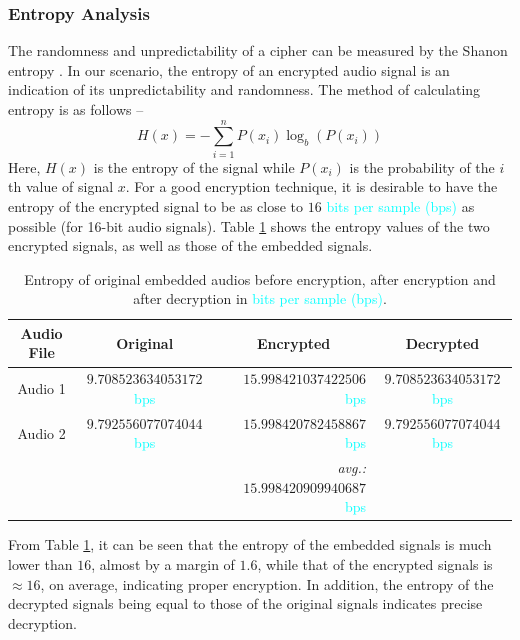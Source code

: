 \documentclass[a4paper]{cas-sc}
\begin{document}
\subsubsection{Entropy Analysis}
The randomness and unpredictability of a cipher can be measured by the Shanon entropy \cite{shannon1948mathematical}. In our scenario, the entropy of an encrypted audio signal is an indication of its unpredictability and randomness. The method of calculating entropy is as follows --
\begin{equation}
    H(x)=-\sum_{i=1}^{n}P(x_i)\log_{b}(P(x_i))
\end{equation}
Here, $H(x)$ is the entropy of the signal while $P(x_i)$ is the probability of the $i$th value of signal $x$. For a good encryption technique, it is desirable to have the entropy of the encrypted signal to be as close to $16$ \textcolor{cyan}{bits per sample (bps)} as possible (for 16-bit audio signals). Table \ref{table:entropy} shows the entropy values of the two encrypted signals, as well as those of the embedded signals.
\begin{table}[pos=h]
    \begin{center}
        \caption{Entropy of original embedded audios before encryption, after encryption and after decryption in \textcolor{cyan}{bits per sample (bps)}.}
        \begin{tabular}{ccrc}
            \hline
            \multicolumn{1}{c|}{Audio File} & Original                                  & \multicolumn{1}{c}{Encrypted}                                      & Decrypted                                 \\ \hline
            \multicolumn{1}{c|}{Audio 1}    & $9.708523634053172$ \textcolor{cyan}{bps} & $15.998421037422506$ \textcolor{cyan}{bps}                         & $9.708523634053172$ \textcolor{cyan}{bps} \\
            \multicolumn{1}{c|}{Audio 2}    & $9.792556077074044$ \textcolor{cyan}{bps} & $15.998420782458867$ \textcolor{cyan}{bps}                         & $9.792556077074044$ \textcolor{cyan}{bps} \\ \hline
                                            &                                           & \textit{avg.:}$\mathbf{~15.998420909940687}$ \textcolor{cyan}{bps} &
        \end{tabular}
        \label{table:entropy}
    \end{center}
\end{table}

From Table \ref{table:entropy}, it can be seen that the entropy of the embedded signals is much lower than $16$, almost by a margin of $1.6$, while that of the encrypted signals is $\approx16$, on average, indicating proper encryption. In addition, the entropy of the decrypted signals being equal to those of the original signals indicates precise decryption.
\end{document}
